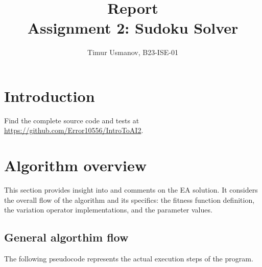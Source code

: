 \documentclass[10pt]{article}
\begin{document}
\title{Report\\Assignment 2: Sudoku Solver}
\author{Timur Usmanov, B23-ISE-01}
\maketitle

\section{Introduction}
Find the complete source code and tests at \url{https://github.com/Error10556/IntroToAI2}.

\section{Algorithm overview}

This section provides insight into and comments on the EA solution. It considers
the overall flow of the algorithm and its specifics: the fitness function definition,
the variation operator implementations, and the parameter values.

\subsection{General algorthim flow}

The following pseudocode represents the actual execution steps of the program.
\end{document}
